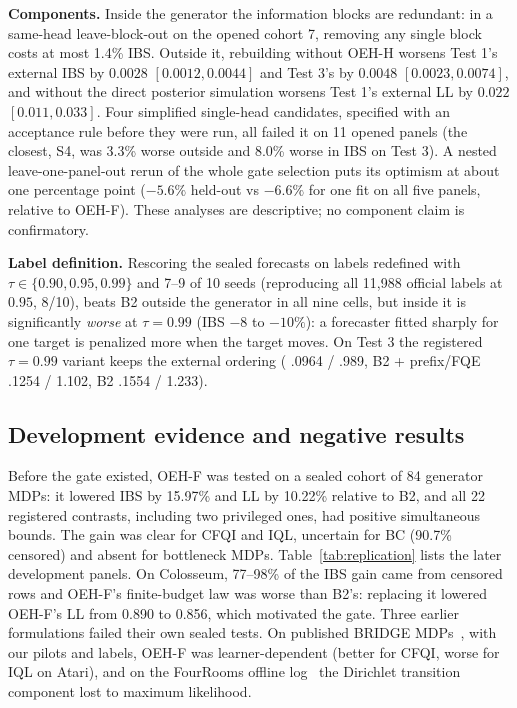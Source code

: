 \textbf{Components.} Inside the generator the information blocks are redundant: in a same-head leave-block-out on the opened cohort 7, removing any single block costs at most 1.4\% IBS. Outside it, rebuilding \OEH{} without OEH-H worsens Test 1's external IBS by $0.0028$ $[0.0012,0.0044]$ and Test 3's by $0.0048$ $[0.0023,0.0074]$, and without the direct posterior simulation worsens Test 1's external LL by $0.022$ $[0.011,0.033]$. Four simplified single-head candidates, specified with an acceptance rule before they were run, all failed it on 11 opened panels (the closest, S4, was 3.3\% worse outside and 8.0\% worse in IBS on Test 3). A nested leave-one-panel-out rerun of the whole gate selection puts its optimism at about one percentage point ($-5.6\%$ held-out vs $-6.6\%$ for one fit on all five panels, relative to OEH-F). These analyses are descriptive; no component claim is confirmatory.

\textbf{Label definition.} Rescoring the sealed forecasts on labels redefined with $\tau\in\{0.90,0.95,0.99\}$ and 7--9 of 10 seeds (reproducing all 11{,}988 official labels at $0.95$, 8/10), \OEH{} beats B2 outside the generator in all nine cells, but inside it is significantly \emph{worse} at $\tau=0.99$ (IBS $-8$ to $-10\%$): a forecaster fitted sharply for one target is penalized more when the target moves. On Test 3 the registered $\tau=0.99$ variant keeps the external ordering (\OEH{} .0964 / .989, B2 + prefix/FQE .1254 / 1.102, B2 .1554 / 1.233).

\subsection{Development evidence and negative results}
\label{sec:development}
Before the gate existed, OEH-F was tested on a sealed cohort of 84 generator MDPs: it lowered IBS by 15.97\% and LL by 10.22\% relative to B2, and all 22 registered contrasts, including two privileged ones, had positive simultaneous bounds. The gain was clear for CFQI and IQL, uncertain for BC (90.7\% censored) and absent for bottleneck MDPs. Table~\ref{tab:replication} lists the later development panels. On Colosseum, 77--98\% of the IBS gain came from censored rows and OEH-F's finite-budget law was worse than B2's: replacing it lowered OEH-F's LL from 0.890 to 0.856, which motivated the gate. Three earlier formulations failed their own sealed tests. On published BRIDGE MDPs~\cite{laidlaw2024stochastic}, with our pilots and labels, OEH-F was learner-dependent (better for CFQI, worse for IQL on Atari), and on the FourRooms offline log~\cite{farama_minari_fourrooms} the Dirichlet transition component lost to maximum likelihood.

